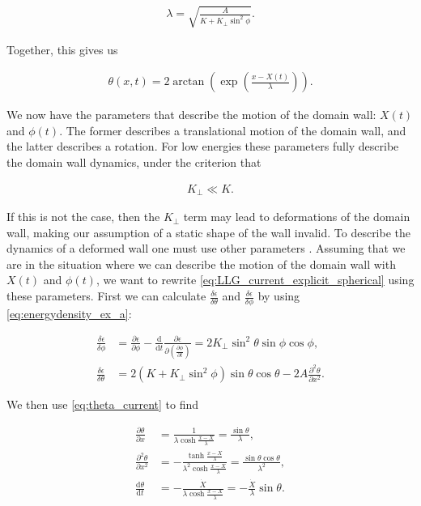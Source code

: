 \documentclass[1p]{elsarticle}		%
\numberwithin{equation}{section}
\begin{document}
\begin{align}
\label{eq:lambda_dw}
\lambda = \sqrt{\frac{A}{K + K_{\perp}\sin^2\phi}}.
\end{align}

Together, this gives us

\begin{align}
\label{eq:theta_current}
\theta(x,t) = 2\arctan(\exp(\frac{x-X(t)}{\lambda})).
\end{align}

We now have the parameters that describe the motion of the domain wall: $X(t)$ and $\phi(t)$. The former describes a translational motion of the domain wall, and the latter describes a rotation. For low energies these parameters fully describe the domain wall dynamics, under the criterion that

\begin{align}
\label{eq:kperp_ll_k}
K_{\perp} \ll K.
\end{align}

If this is not the case, then the $K_{\perp}$ term may lead to deformations of the domain wall, making our assumption of a static shape of the wall invalid. To describe the dynamics of a deformed wall one must use other parameters \cite{TataraKohnoShibata2008}. Assuming that we are in the situation where we can describe the motion of the domain wall with $X(t)$ and $\phi(t)$, we want to rewrite \eqref{eq:LLG_current_explicit_spherical} using these parameters. First we can calculate $\frac{\delta \epsilon}{\delta \theta}$ and $\frac{\delta \epsilon}{\delta \phi}$ by using \eqref{eq:energydensity_ex_a}:

\begin{align}
\frac{\delta \epsilon}{\delta \phi} &= \frac{\partial \epsilon}{\partial \phi} - \frac{\textrm{d}}{\textrm{d} t} \frac{\partial \epsilon}{\partial (\frac{\partial \phi}{\partial t})} = 2K_{\perp}\sin^2 \theta\sin\phi\cos\phi, \\
\frac{\delta \epsilon}{\delta \theta} &= 2(K+K_{\perp} \sin^2 \phi)\sin\theta\cos\theta - 2A\frac{\partial^2 \theta}{\partial x^2}.
\end{align}

We then use \eqref{eq:theta_current}  to find

\begin{align}
\frac{\partial \theta}{\partial x} &=  \frac{1}{\lambda\cosh\frac{x-X}{\lambda}} = \frac{\sin\theta}{\lambda}, \\
\frac{\partial^2 \theta}{\partial x^2} &=  -\frac{\tanh\frac{x-X}{\lambda}}{\lambda^2\cosh\frac{x-X}{\lambda}} = \frac{\sin\theta\cos\theta}{\lambda^2}, \\
\frac{\textrm{d} \theta}{\textrm{d} t} &= -\frac{\dot{X}}{\lambda\cosh\frac{x-X}{\lambda}} = -\frac{\dot{X}}{\lambda}\sin\theta.
\end{align}
\end{document}
